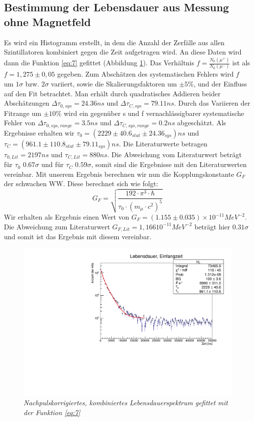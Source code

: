 \subsection{Bestimmung der Lebensdauer aus Messung ohne Magnetfeld}
Es wird ein Histogramm erstellt, in dem die Anzahl der Zerfälle aus allen Szintillatoren kombiniert gegen die Zeit aufgetragen wird. An diese Daten wird dann die Funktion \ref{eq:7} gefittet (Abbildung \ref{fig:Abbildung 2}). Das Verhältnis $f=\frac{N_0(\mu ^{+})}{N_0(\mu ^{-})}$ ist als $f = 1,275 \pm 0,05$ gegeben. Zum Abschätzen des systematischen Fehlers wird $f$ um $1\sigma$ bzw. $2\sigma$ variiert, sowie die Skalierungsfaktoren um $\pm 5\%$, und der Einfluss auf den Fit betrachtet. Man erhält durch quadratisches Addieren beider Abschätzungen $\Delta \tau _{0,sys} = 24.36 ns$ und $\Delta \tau _{C,sys} = 79.11 ns$. Durch das Variieren der Fitrange um $\pm 10 \%$ wird ein gegenüber s und f vernachlässigbarer systematische Fehler von $\Delta \tau _{0,sys,range} = 3.5 ns$ und $\Delta \tau _{C,sys,range} = 0.2 ns$ abgeschätzt.
Als Ergebnisse erhalten wir $\tau _0 = (2229\pm 40.6_{stat} \pm 24.36_{sys}) ns$ und $\tau _C= (961.1\pm 110.8_{stat} \pm 79.11_{sys}) ns$. Die Literaturwerte betragen $\tau_{0,Lit} = 2197 ns$ und $\tau_{C,Lit} = 880 ns$. Die Abweichung vom Literaturwert beträgt für $\tau_0$ $0.67\sigma$ und für $\tau_C$ $0.59 \sigma$, somit sind die Ergebnisse mit den Literaturwerten vereinbar. Mit unserem Ergebnis berechnen wir nun die Kopplungskonstante $G_F$ der schwachen WW. Diese berechnet sich wie folgt:
\begin{equation}
\label{eq:11}
	G_F = \sqrt{\frac{192 \cdot \pi ^{3}\cdot \hbar }{\tau_0 \cdot \left(m_{\mu} \cdot c^{2}\right)^{5}}}
\end{equation}
Wir erhalten als Ergebnis einen Wert von $G_F =(1.155 \pm 0.035)\times 10^{-11} MeV^{-2}$. Die Abweichung zum Literaturwert $G_{F,Lit}= 1,16610^{-11}MeV^{-2}$ beträgt hier $0.31\sigma$ und somit ist das Ergebnis mit diesem vereinbar.
\begin{figure}[h]
	\centering
	\includegraphics[width=120mm]{LebensdauerEinfangzeitKombiniert}
	\caption{ \itshape Nachpulskorrigiertes, kombiniertes Lebensdauerspektrum gefittet mit der Funktion \ref{eq:7}}
	\label{fig:Abbildung 2}
\end{figure}

